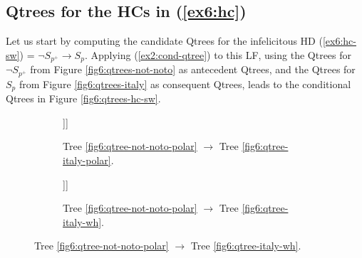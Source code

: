 \subsection{Qtrees for the HCs in (\ref{ex6:hc})}

Let us start by computing the candidate Qtrees for the infelicitous HD (\ref{ex6:hc-sw}) = $\neg S_{p^+} \rightarrow S_p$. Applying (\ref{ex2:cond-qtree}) to this LF, using the Qtrees for $\neg S_{p^+}$ from Figure \ref{fig6:qtrees-not-noto} as antecedent Qtrees, and the Qtrees for $S_p$ from Figure \ref{fig6:qtrees-italy} as consequent Qtrees, leads to the conditional Qtrees in Figure \ref{fig6:qtrees-hc-sw}. 

\begin{figure}[H]
\centering
\begin{subfigure}[b]{.45\linewidth}
	\centering
	\scalebox{1}
	{\begin{forest}
			[CS [\textcolor{orange}{Noto}] [{$\neg$\textcolor{orange}{Noto}} [\fbox{\textcolor{blue}{Italy}$\cap\neg$\textcolor{orange}{Noto}}][$\neg$\textcolor{blue}{Italy}]]]
	\end{forest}}
	\caption{Tree \ref{fig6:qtree-not-noto-polar} $\rightarrow$ Tree \ref{fig6:qtree-italy-polar}.}\label{fig6:tree-hc-sw-polar-polar}
\end{subfigure}\hfill
\begin{subfigure}[b]{.45\linewidth}
	\centering
	\scalebox{1}
	{\begin{forest}
			[CS [\textcolor{orange}{Noto}] [{$\neg$\textcolor{orange}{Noto}} [\fbox{\textcolor{blue}{Italy}$\cap\neg$\textcolor{orange}{Noto}}][\textcolor{blue}{France}] [\textcolor{blue}{...}]]]
	\end{forest}}
	\caption{Tree \ref{fig6:qtree-not-noto-polar} $\rightarrow$ Tree \ref{fig6:qtree-italy-wh}.}\label{fig6:tree-hc-sw-polar-wh}
\end{subfigure}


\end{figure}
